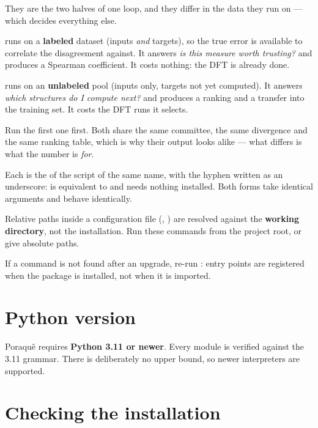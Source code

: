 \begin{pnote}[title={The last two are not the same command twice}]
They are the two halves of one loop, and they differ in the data they run on
--- which decides everything else.

 runs on a \textbf{labeled} dataset (inputs
\emph{and} targets), so the true error is available to correlate the
disagreement against. It answers \emph{is this measure worth trusting?} and
produces a Spearman coefficient. It costs nothing: the DFT is already done.

 runs on an \textbf{unlabeled} pool (inputs
only, targets not yet computed). It answers \emph{which structures do I
compute next?} and produces a ranking and a transfer into the training set.
It costs the DFT runs it selects.

Run the first one first. Both share the same committee, the same divergence
and the same ranking table, which is why their output looks alike --- what
differs is what the number is \emph{for}.
\end{pnote}

Each is the  of the script of the same name, with the hyphen
written as an underscore:  is equivalent
to  and needs nothing installed. Both forms take identical
arguments and behave identically.

\begin{pnote}
Relative paths inside a configuration file (, )
are resolved against the \textbf{working directory}, not the installation. Run
these commands from the project root, or give absolute paths.
\end{pnote}

If a command is not found after an upgrade, re-run :
entry points are registered when the package is installed, not when it is
imported.

\section{Python version}

\begin{pnote}
Poraqu\^e requires \textbf{Python 3.11 or newer}. Every module is verified
against the 3.11 grammar. There is deliberately no upper bound, so newer
interpreters are supported.
\end{pnote}

\section{Checking the installation}


